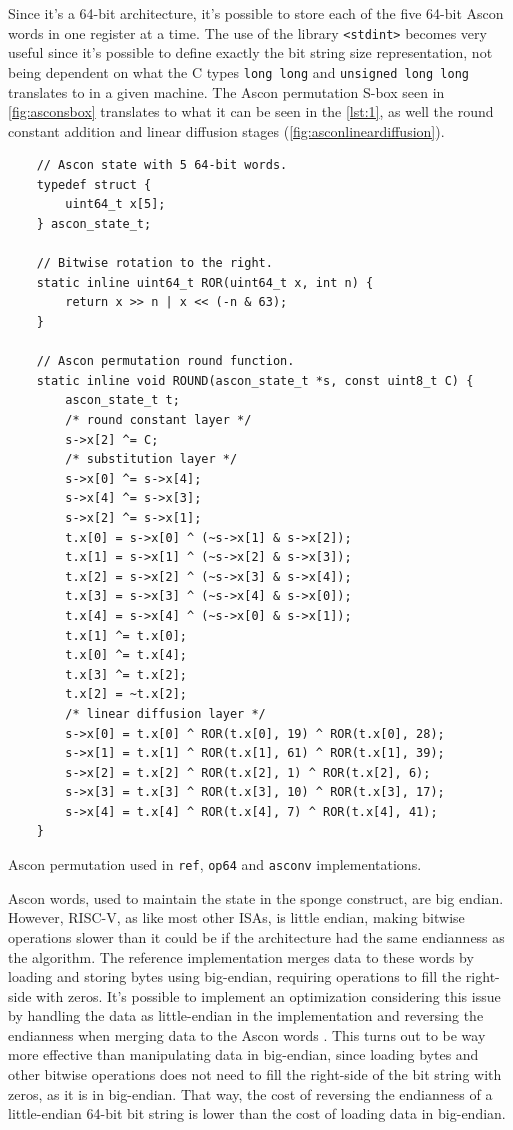 \documentclass[11pt,twoside]{article}
\begin{document}
Since it's a 64-bit architecture, it's possible to store each of the five 64-bit Ascon words in one register at a time. The use of the library \texttt{<stdint>} becomes very useful since it's possible to define exactly the bit string size representation, not being dependent on what the C types \texttt{long long} and \texttt{unsigned long long} translates to in a given machine. The Ascon permutation S-box seen in \cref{fig:asconsbox} translates to what it can be seen in the \cref{lst:1}, as well the round constant addition and linear diffusion stages (\cref{fig:asconlineardiffusion}).

\begin{listing}[ht!]
  \begin{verbatim}
    // Ascon state with 5 64-bit words.
    typedef struct {
        uint64_t x[5];
    } ascon_state_t;

    // Bitwise rotation to the right.
    static inline uint64_t ROR(uint64_t x, int n) {
        return x >> n | x << (-n & 63);
    }

    // Ascon permutation round function.
    static inline void ROUND(ascon_state_t *s, const uint8_t C) {
        ascon_state_t t;
        /* round constant layer */
        s->x[2] ^= C;
        /* substitution layer */
        s->x[0] ^= s->x[4];
        s->x[4] ^= s->x[3];
        s->x[2] ^= s->x[1];
        t.x[0] = s->x[0] ^ (~s->x[1] & s->x[2]);
        t.x[1] = s->x[1] ^ (~s->x[2] & s->x[3]);
        t.x[2] = s->x[2] ^ (~s->x[3] & s->x[4]);
        t.x[3] = s->x[3] ^ (~s->x[4] & s->x[0]);
        t.x[4] = s->x[4] ^ (~s->x[0] & s->x[1]);
        t.x[1] ^= t.x[0];
        t.x[0] ^= t.x[4];
        t.x[3] ^= t.x[2];
        t.x[2] = ~t.x[2];
        /* linear diffusion layer */
        s->x[0] = t.x[0] ^ ROR(t.x[0], 19) ^ ROR(t.x[0], 28);
        s->x[1] = t.x[1] ^ ROR(t.x[1], 61) ^ ROR(t.x[1], 39);
        s->x[2] = t.x[2] ^ ROR(t.x[2], 1) ^ ROR(t.x[2], 6);
        s->x[3] = t.x[3] ^ ROR(t.x[3], 10) ^ ROR(t.x[3], 17);
        s->x[4] = t.x[4] ^ ROR(t.x[4], 7) ^ ROR(t.x[4], 41);
    }
  \end{verbatim}
  \caption{Ascon permutation used in \texttt{ref}, \texttt{op64} and \texttt{asconv} implementations.}
  \label{lst:1}
\end{listing}

Ascon words, used to maintain the state in the sponge construct, are big endian. However, RISC-V, as like most other ISAs, is little endian, making bitwise operations slower than it could be if the architecture had the same endianness as the algorithm. The reference implementation merges data to these words by loading and storing bytes using big-endian, requiring operations to fill the right-side with zeros. It's possible to implement an optimization considering this issue by handling the data as little-endian in the implementation and reversing the endianness when merging data to the Ascon words \cite{jellema2019optimizing}. This turns out to be way more effective than manipulating data in big-endian, since loading bytes and other bitwise operations does not need to fill the right-side of the bit string with zeros, as it is in big-endian. That way, the cost of reversing the endianness of a little-endian 64-bit bit string is lower than the cost of loading data in big-endian.
\end{document}
